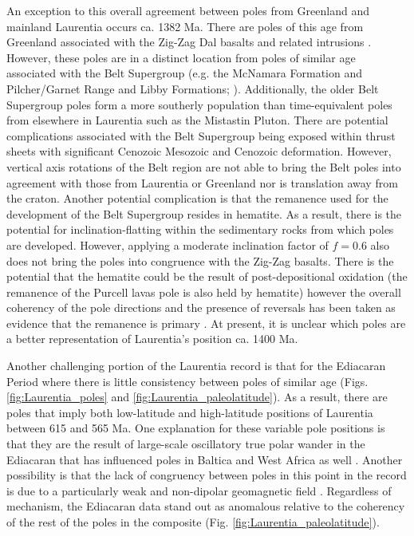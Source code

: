 \documentclass[11pt,letterpaper]{article}
\begin{document}
An exception to this overall agreement between poles from Greenland and mainland Laurentia occurs ca. 1382 Ma. There are poles of this age from Greenland associated with the Zig-Zag Dal basalts and related intrusions \citep{Marcussen1983a, Abrahamsen1987a}. However, these poles are in a distinct location from poles of similar age associated with the Belt Supergroup (e.g. the McNamara Formation and Pilcher/Garnet Range and Libby Formations; \citealp{Elston2002a}). Additionally, the older Belt Supergroup poles form a more southerly population than time-equivalent poles from elsewhere in Laurentia such as the Mistastin Pluton. There are potential complications associated with the Belt Supergroup being exposed within thrust sheets with significant Cenozoic Mesozoic and Cenozoic deformation. However, vertical axis rotations of the Belt region are not able to bring the Belt poles into agreement with those from Laurentia or Greenland nor is translation away from the craton. Another potential complication is that the remanence used for the development of the Belt Supergroup resides in hematite. As a result, there is the potential for inclination-flatting within the sedimentary rocks from which poles are developed. However, applying a moderate inclination factor of $f=0.6$ also does not bring the poles into congruence with the Zig-Zag basalts. There is the potential that the hematite could be the result of post-depositional oxidation (the remanence of the Purcell lavas pole is also held by hematite) however the overall coherency of the pole directions and the presence of reversals has been taken as evidence that the remanence is primary \citep{Elston2002a}. At present, it is unclear which poles are a better representation of Laurentia's position ca. 1400 Ma.

Another challenging portion of the Laurentia record is that for the Ediacaran Period where there is little consistency between poles of similar age (Figs. \ref{fig:Laurentia_poles} and \ref{fig:Laurentia_paleolatitude}). As a result, there are poles that imply both low-latitude and high-latitude positions of Laurentia between 615 and 565 Ma. One explanation for these variable pole positions is that they are the result of large-scale oscillatory true polar wander in the Ediacaran that has influenced poles in Baltica and West Africa as well \citep{McCausland2007a, Robert2017a}. Another possibility is that the lack of congruency between poles in this point in the record is due to a particularly weak and non-dipolar geomagnetic field \citep{Abrajevitch2010a, Bono2019a}. Regardless of mechanism, the Ediacaran data stand out as anomalous relative to the coherency of the rest of the poles in the composite (Fig. \ref{fig:Laurentia_paleolatitude}).
\end{document}
